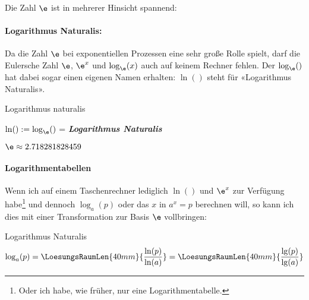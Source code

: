 Die Zahl $\e$ ist in mehrerer Hinsicht spannend:

\paragraph{Logarithmus Naturalis:} Da die
Zahl $\e$ bei exponentiellen Prozessen eine sehr große Rolle spielt,
darf die Eulersche Zahl $\e$, $\e^x$ und $\log_{\e}(x)$ auch auf keinem Rechner fehlen. Der $\log_{\e}()$ hat dabei sogar einen eigenen Namen erhalten:
$\ln()$ steht für «Logarithmus Naturalis».

\begin{definition}{Logarithmus naturalis}{}
  
  $\ln() := \log_{\e}()$ = \textit{\textbf{Logarithmus Naturalis}}

  $\e\approx 2.718281828459$
\end{definition}

\paragraph{Logarithmentabellen}
Wenn ich auf einem Taschenrechner lediglich $\ln()$ und $\e^x$ zur
Verfügung habe\footnote{Oder ich habe, wie früher, nur eine
Logarithmentabelle.} und dennoch $\log_a(p)$ oder das $x$ in $a^x=p$ berechnen will, so kann ich dies mit einer Transformation zur Basis $\e$ vollbringen:

\begin{gesetz}{Logarithmus Naturalis}{}
  $$\log_a(p) = \LoesungsRaumLen{40mm}{\frac{\ln(p)}{\ln(a)}}  = \LoesungsRaumLen{40mm}{\frac{\lg(p)}{\lg(a)}}$$
\end{gesetz}



\newpage

